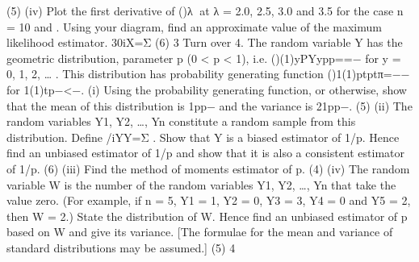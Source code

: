 (5)
(iv) Plot the first derivative of ()λ􀁁 at λ = 2.0, 2.5, 3.0 and 3.5 for the case n = 10 and . Using your diagram, find an approximate value of the maximum likelihood estimator. 30iX=Σ
(6)
3
Turn over
4. The random variable Y has the geometric distribution, parameter p (0 < p < 1), i.e.
()(1)yPYypp==− for y = 0, 1, 2, … .
This distribution has probability generating function
()1(1)ptptπ=−− for 1(1)tp−<−.
(i) Using the probability generating function, or otherwise, show that the mean of this distribution is 1pp− and the variance is 21pp−.
(5)
(ii) The random variables Y1, Y2, …, Yn constitute a random sample from this distribution.
Define /iYY=Σ . Show that Y is a biased estimator of 1/p. Hence find an unbiased estimator of 1/p and show that it is also a consistent estimator of 1/p.
(6)
(iii) Find the method of moments estimator of p.
(4)
(iv) The random variable W is the number of the random variables Y1, Y2, …, Yn that take the value zero. (For example, if n = 5, Y1 = 1, Y2 = 0, Y3 = 3, Y4 = 0 and Y5 = 2, then W = 2.) State the distribution of W. Hence find an unbiased estimator of p based on W and give its variance. [The formulae for the mean and variance of standard distributions may be assumed.]
(5)
4
